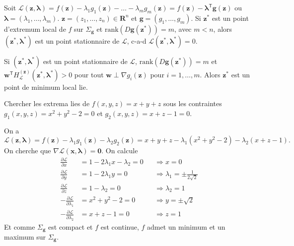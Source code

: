 \begin{theorem}
Soit $\mathcal{L}(\boldsymbol{z},\boldsymbol{\lambda})=f(\boldsymbol{z})-\lambda_{1}g_{1}(\boldsymbol{z})-\dots -\lambda _{m}g_{m}(\boldsymbol{z})=f(\boldsymbol{z})-\boldsymbol{\lambda}^{\mathsf{T}}\boldsymbol{g}(\boldsymbol{z})$ ou $\boldsymbol{\lambda}=(\lambda_{1},\dots,\lambda _{m})$. $\boldsymbol{z}=(z_{1},\dots,z_{n})\in \mathbf{R}^{n}$ et $\boldsymbol{g}=(g_{1},\dots,g_{m})$. Si $\boldsymbol{z}^{*}$ est un point d'extremum local de $f$ sur $\Sigma _{\boldsymbol{g}}$ et $\mathrm{rank}(D\boldsymbol{g}(\boldsymbol{z}^{*}))=m$, avec $m<n$, alors $(\boldsymbol{z}^{*},\boldsymbol{\lambda}^{*})$ est un point stationnaire de $\mathcal{L}$, c-a-d $\mathcal{L}(\boldsymbol{z}^{*},\boldsymbol{\lambda}^{*})=0$.
\end{theorem}

\begin{theorem}
Si $(\boldsymbol{z}^{*},\boldsymbol{\lambda}^{*})$ est un point stationnaire de $\mathcal{L}$, $\mathrm{rank}(D\boldsymbol{g}(\boldsymbol{z}^{*}))=m$ et $\boldsymbol{w}^{\mathsf{T}}H_{\mathcal{L}}^{(\boldsymbol{z})}(\boldsymbol{z}^{*},\boldsymbol{\lambda}^{*})>0$ pour tout $\boldsymbol{w}\perp \nabla g_{i}(\boldsymbol{z})$ pour $i=1,\dots,m$. Alors $\boldsymbol{z}^{*}$ est un point de minimum local lie.
\end{theorem}
\begin{example}
Chercher les extrema lies de $f(x,y,z)=x+y+z$ sous les contraintes $g_{1}(x,y,z)=x^{2}+y^{2}-2=0$ et $g_{2}(x,y,z)=x+z-1=0$.

On a $$\mathcal{L}(\boldsymbol{z},\boldsymbol{\lambda})=f(\boldsymbol{z})-\lambda_{1}g_{1}(\boldsymbol{z})-\lambda_{2}g_{2}(\boldsymbol{z})=x+y+z-\lambda_{1}(x^{2}+y^{2}-2)-\lambda_{2}(x+z-1).$$ On cherche que $\nabla \mathcal{L}(\boldsymbol{x},\boldsymbol{\lambda})=\boldsymbol{0}$. On calcule
\begin{align*}
\frac{ \partial \mathcal{L} }{ \partial x }  &=1-2\lambda_{1}x-\lambda_{2} =0   &  & \Rightarrow x=0\\
\frac{ \partial \mathcal{L}}{ \partial y }  & =1-2\lambda_{1}y =0  &  & \Rightarrow \lambda_{1}=\pm \frac{1}{2\sqrt{ 2 }}\\
\frac{ \partial \mathcal{L} }{ \partial z } & =1-\lambda_{2}=0   &  & \Rightarrow \lambda_{2}=1 \\
-\frac{ \partial \mathcal{L} }{ \partial \lambda_{1} }  &  =x^{2}+y^{2}-2 =0 &  & \Rightarrow y=\pm \sqrt{ 2 }\\
-\frac{ \partial \mathcal{L} }{ \partial \lambda_{2} }  & =x+z-1 =0  &  & \Rightarrow z=1
\end{align*}
Et comme $\Sigma _{\boldsymbol{g}}$ est compact et $f$ est continue, $f$ admet un minimum et un maximum sur $\Sigma _{\boldsymbol{g}}$.
\end{example}



